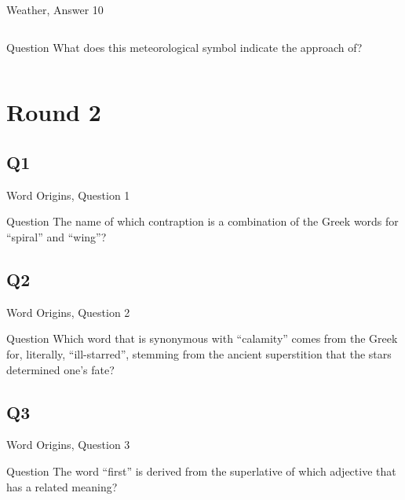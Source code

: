 \documentclass[11pt]{beamer}
\begin{document}
\begin{frame}[t]{Weather, Answer 10}
\begin{columns}[T,totalwidth=\linewidth]
\begin{column}{0.32\linewidth}
\begin{block}{Question}
What does this meteorological symbol indicate the approach of?
\end{block}
\end{column}
\begin{column}{0.65\linewidth}
\begin{center}
\texttt{[image: \{Images/coldfront]}.png}
\end{center}
\end{column}
\end{columns}
\end{frame}
\def\thisSectionName{Word Origins}
\section{Round 2}
\subsection*{Q1}
\begin{frame}[t]{Word Origins, Question 1}
\begin{block}{Question}
The name of which contraption is a combination of the Greek words for ``spiral'' and ``wing''?
\end{block}
\end{frame}
\subsection*{Q2}
\begin{frame}[t]{Word Origins, Question 2}
\begin{block}{Question}
Which word that is synonymous with ``calamity'' comes from the Greek for, literally, ``ill-starred'', stemming from the ancient superstition that the stars determined one's fate?
\end{block}
\end{frame}
\subsection*{Q3}
\begin{frame}[t]{Word Origins, Question 3}
\begin{block}{Question}
The word ``first'' is derived from the superlative of which adjective that has a related meaning?
\end{block}
\end{frame}
\end{document}
